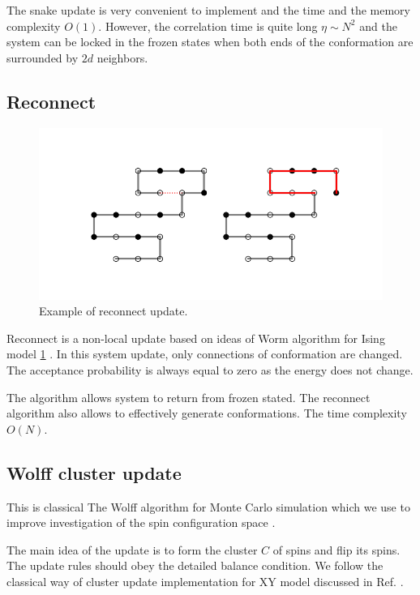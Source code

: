 The snake update is very convenient to implement and the time and the  memory complexity $O(1)$. However, the correlation time is quite long $ \eta \sim N^2 $ and the system can be locked in the frozen states when both ends of the conformation are surrounded by $2d$ neighbors. 

\subsection{Reconnect}

 \begin{figure}[H] 
	\centering
	\includegraphics[scale=0.2]{Images/reconnect.png} 
	\captionsetup{justification=centering} \caption{ Example of reconnect update. }
	\label{fig:reconnect}
\end{figure}

Reconnect is a non-local update based on ideas of Worm algorithm for Ising model \ref{fig:reconnect} \cite{Worm}.   In this system update, only connections of conformation are changed. The acceptance probability is always equal to zero as the energy does not change. 

The algorithm allows system to return from frozen stated. The reconnect algorithm also allows to effectively generate conformations. The time complexity $O(N)$.  

\subsection{Wolff cluster update}
This is classical The Wolff algorithm for Monte Carlo simulation which we use to improve investigation of the spin configuration space  \cite{wolff}. 

The main idea of the update is to form the cluster $C$ of spins and flip its spins. The update rules should obey the detailed balance condition. We follow the classical way of cluster update implementation for XY model discussed in Ref. \cite{newman1999monte}.  

